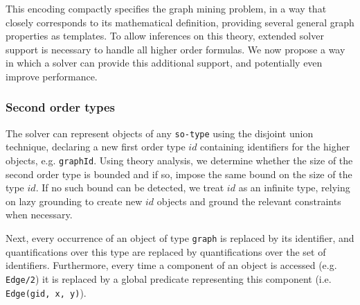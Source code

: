 This encoding compactly specifies the graph mining problem, in a way that closely corresponds to its mathematical definition, providing several general graph properties as templates.
To allow inferences on this theory, extended solver support is necessary to handle all higher order formulas.
We now propose a way in which a solver can provide this additional support, and potentially even improve performance.
\vspace{-1em}
\subsubsection{Second order types}
The solver can represent objects of any \lstinline|so-type| using the disjoint union technique, declaring a new first order type $id$ containing identifiers for the higher objects, e.g. \lstinline|graphId|.
Using theory analysis, we determine whether the size of the second order type is bounded and if so, impose the same bound on the size of the type $id$.
If no such bound can be detected, we treat $id$ as an infinite type, relying on lazy grounding to create new $id$ objects and ground the relevant constraints when necessary.

Next, every occurrence of an object of type \lstinline|graph| is replaced by its identifier, and quantifications over this type are replaced by quantifications over the set of identifiers. Furthermore, every time a component of an object is accessed (e.g. \lstinline|Edge/2|) it is replaced by a global predicate
representing this component (i.e. \lstinline|Edge(gid, x, y)|).
\vspace{-1em}
